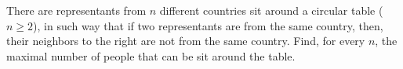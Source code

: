 There are representants from $n$ different countries sit around a circular table ($n\geq2$), in such way that if two representants are from the same country, then, their neighbors to the right are not from the same country. Find, for every $n$,  the maximal number of people that can be sit around the table.